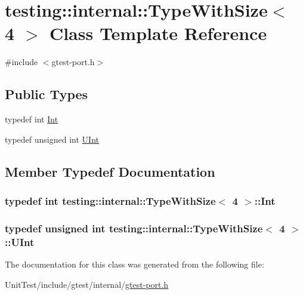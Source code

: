 \hypertarget{classtesting_1_1internal_1_1_type_with_size_3_014_01_4}{\section{testing\+:\+:internal\+:\+:Type\+With\+Size$<$ 4 $>$ Class Template Reference}
\label{classtesting_1_1internal_1_1_type_with_size_3_014_01_4}
}


{\ttfamily \#include $<$gtest-\/port.\+h$>$}

\subsection*{Public Types}
\begin{DoxyCompactItemize}
\item 
typedef int \hyperlink{classtesting_1_1internal_1_1_type_with_size_3_014_01_4_a80351860c00ed665e73f952143f4484a}{Int}
\item 
typedef unsigned int \hyperlink{classtesting_1_1internal_1_1_type_with_size_3_014_01_4_a7d559570f830bf35d095eeb94d98de58}{U\+Int}
\end{DoxyCompactItemize}


\subsection{Member Typedef Documentation}
\hypertarget{classtesting_1_1internal_1_1_type_with_size_3_014_01_4_a80351860c00ed665e73f952143f4484a}{
\subsubsection[{Int}]{\setlength{\rightskip}{0pt plus 5cm}typedef int {\bf testing\+::internal\+::\+Type\+With\+Size}$<$ 4 $>$\+::{\bf Int}}}\label{classtesting_1_1internal_1_1_type_with_size_3_014_01_4_a80351860c00ed665e73f952143f4484a}
\hypertarget{classtesting_1_1internal_1_1_type_with_size_3_014_01_4_a7d559570f830bf35d095eeb94d98de58}{
\subsubsection[{U\+Int}]{\setlength{\rightskip}{0pt plus 5cm}typedef unsigned int {\bf testing\+::internal\+::\+Type\+With\+Size}$<$ 4 $>$\+::{\bf U\+Int}}}\label{classtesting_1_1internal_1_1_type_with_size_3_014_01_4_a7d559570f830bf35d095eeb94d98de58}


The documentation for this class was generated from the following file\+:\begin{DoxyCompactItemize}
\item 
Unit\+Test/include/gtest/internal/\hyperlink{gtest-port_8h}{gtest-\/port.\+h}\end{DoxyCompactItemize}
